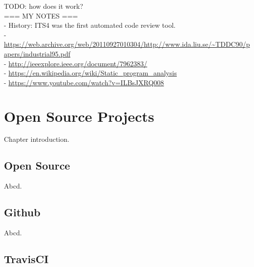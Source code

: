 {\color{red}TODO: how does it work?}\\

{\color{red}=== MY NOTES ===}\\
- History: ITS4 was the first automated code review tool.\\
- \url{https://web.archive.org/web/20110927010304/http://www.ida.liu.se/~TDDC90/papers/industrial95.pdf}\\
- \url{http://ieeexplore.ieee.org/document/7962383/}\\
- \url{https://en.wikipedia.org/wiki/Static_program_analysis}\\
- \url{https://www.youtube.com/watch?v=ILBsJXRQ008}\\

\chapter{Open Source Projects}

Chapter introduction.

\section{Open Source}

Abcd.

\section{Github}

Abcd.

\section{TravisCI}

